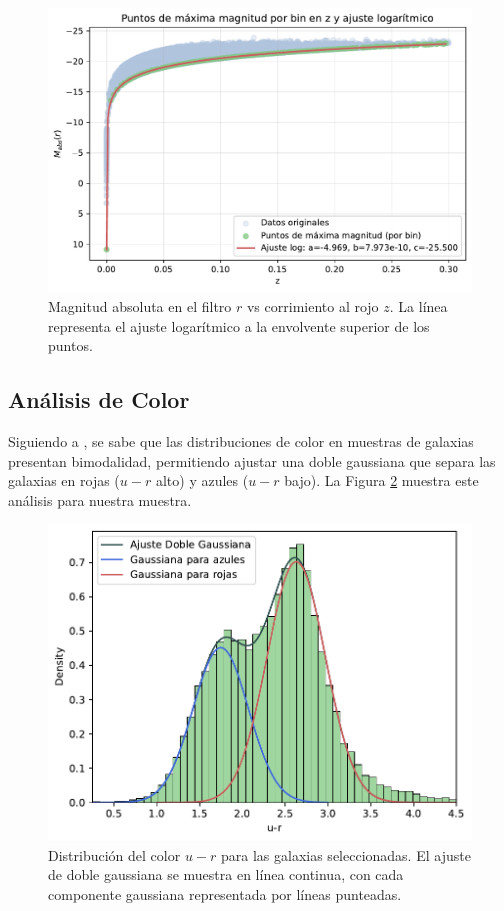 \documentclass[twocolumn]{article}
\begin{document}
\begin{figure}[t]
\includegraphics[width=\linewidth]{mabs_vs_z_ajuste_log_max.pdf}
\caption{Magnitud absoluta en el filtro $r$ vs corrimiento al rojo $z$. La línea representa el ajuste logarítmico a la envolvente superior de los puntos.}
\label{fig:mabs_log}
\end{figure}

\subsection{Análisis de Color}

Siguiendo a \citet{2004Bimodalidad}, se sabe que las distribuciones de color en muestras de galaxias presentan bimodalidad, permitiendo ajustar una doble gaussiana que separa las galaxias en rojas ($u-r$ alto) y azules ($u-r$ bajo). La Figura \ref{fig:ur} muestra este análisis para nuestra muestra.

\begin{figure}[t]
\includegraphics[width=\linewidth]{ur.pdf}
\caption{Distribución del color $u-r$ para las galaxias seleccionadas. El ajuste de doble gaussiana se muestra en línea continua, con cada componente gaussiana representada por líneas punteadas.}
\label{fig:ur}
\end{figure}
\end{document}
